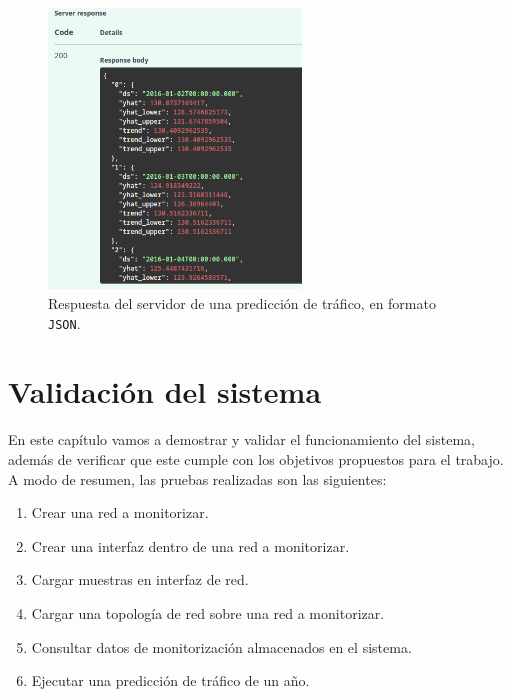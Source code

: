 \documentclass[a4paper, oneside, 12pt]{book}
\begin{document}
\begin{enumerate}
\begin{itemize}
			\pagebreak
			
			\begin{figure}[h!]
				\begin{center}
					\includegraphics[width=0.6\textwidth]{img/output_forecast_json.png}
					\caption{Respuesta del servidor de una predicción de tráfico, en formato \texttt{JSON}.}
					\label{img: output forecast json}
				\end{center}
			\end{figure}
		\end{itemize}
	\end{enumerate}
	
	\pagebreak
	
	\chapter{Validación del sistema}
	
	\noindent En este capítulo vamos a demostrar y validar el funcionamiento del sistema, además de verificar que este cumple con los objetivos propuestos para el trabajo. A modo de resumen, las pruebas realizadas son las siguientes:
	
	\begin{enumerate}
		\item Crear una red a monitorizar.
		\item Crear una interfaz dentro de una red a monitorizar.
		\item Cargar muestras en interfaz de red.
		\item Cargar una topología de red sobre una red a monitorizar.
		\item Consultar datos de monitorización almacenados en el sistema.
		\item Ejecutar una predicción de tráfico de un año.
	\end{enumerate}
\end{document}
